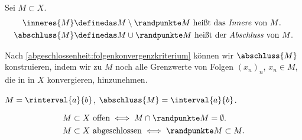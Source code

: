 \begin{notation*}
    Sei \( M\subset X \).
    \begin{align*}
        \inneres{M}&\definedas M\setminus \randpunkte M\text{ heißt das \emph{Innere} von \( M \).}\\
        \abschluss{M}&\definedas M\cup \randpunkte M\text{ heißt der \emph{Abschluss} von \( M \).}
    \end{align*}
\end{notation*}
Nach \ref{abgeschlossenheit:folgenkonvergenzkriterium} können wir \( \abschluss{M} \) konstruieren, indem wir zu \( M \) noch alle Grenzwerte von Folgen \( (x_n)_n \), \( x_n\in M \), die in in \( X \) konvergieren, hinzunehmen.
\begin{beispiel*}
    \( M=\rinterval{a}{b} \), \( \abschluss{M}=\interval{a}{b} \).
\end{beispiel*}
\begin{bemerkung*}
    \begin{align*}
        M&\subset X \text{ offen} \iff M\cap \randpunkte M=\emptyset.\\
        M&\subset X \text{ abgeschlossen} \iff \randpunkte M \subset M.
    \end{align*}
    
\end{bemerkung*}
